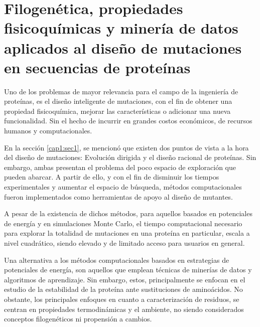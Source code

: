 \chapter{Filogenética, propiedades fisicoquímicas y minería de datos aplicados al diseño de mutaciones en secuencias de proteínas \label{cap4}}

\ifpdf
    \graphicspath{{Chapter4/Figs/Raster/}{Chapter4/Figs/PDF/}{Chapter4/Figs/}}
\else
    \graphicspath{{Chapter4/Figs/Vector/}{Chapter4/Figs/}}
\fi

Uno de los problemas de mayor relevancia para el campo de la ingeniería de proteínas, es el diseño inteligente de mutaciones, con el fin de obtener una propiedad fisicoquímica, mejorar las características o adicionar una nueva funcionalidad. Sin el hecho de incurrir en grandes costos económicos, de recursos humanos y computacionales.

En la sección \ref{cap1:sec1}, se mencionó que existen dos puntos de vista a la hora del diseño de mutaciones: Evolución dirigida y el diseño racional de proteínas. Sin embargo, ambas presentan el problema del poco espacio de exploración que pueden abarcar. A partir de ello, y con el fin de disminuir los tiempos experimentales y aumentar el espacio de búsqueda, métodos computacionales fueron implementados como herramientas de apoyo al diseño de mutantes. 

A pesar de la existencia de dichos métodos, para aquellos basados en potenciales de energía y en simulaciones Monte Carlo, el tiempo computacional necesario para explorar la totalidad de mutaciones en una proteína en particular, escala a nivel cuadrático, siendo elevado y de limitado acceso para usuarios en general.

Una alternativa a los métodos computacionales basados en estrategias de potenciales de energía, son aquellos que emplean técnicas de minerías de datos y algoritmos de aprendizaje. Sin embargo, estos, principalmente se enfocan en el estudio de la estabilidad de la proteína ante sustituciones de aminoácidos. No obstante, los principales enfoques en cuanto a caracterización de residuos, se centran en propiedades termodinámicas y el ambiente, no siendo considerados conceptos filogenéticos ni propensión a cambios. 


